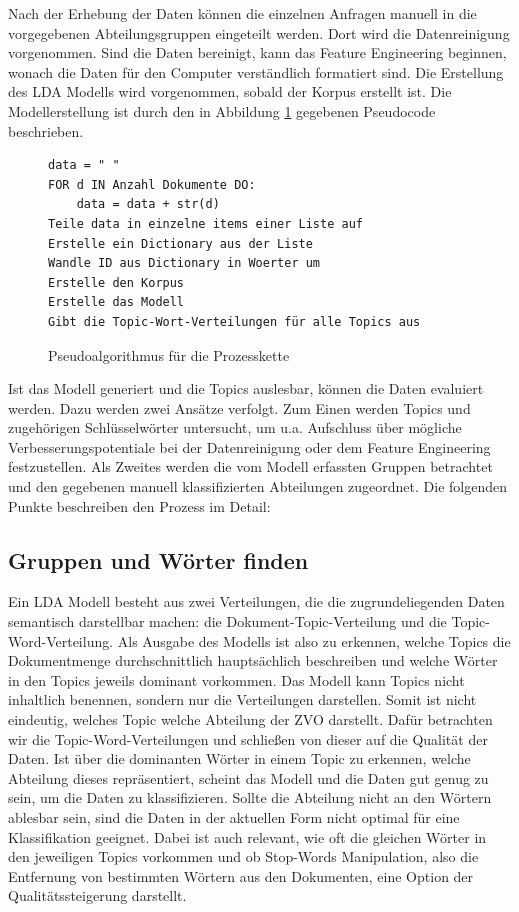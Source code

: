 \documentclass[german,version-2020-11]{uzl-thesis}
\begin{document}
Nach der Erhebung der Daten können die einzelnen Anfragen manuell in die vorgegebenen Abteilungsgruppen eingeteilt werden. Dort wird die Datenreinigung vorgenommen. Sind die Daten bereinigt, kann das Feature Engineering beginnen, wonach die Daten für den Computer verständlich formatiert sind. Die Erstellung des LDA Modells wird vorgenommen, sobald der Korpus erstellt ist. Die Modellerstellung ist durch den in Abbildung \ref{fig:code1} gegebenen Pseudocode beschrieben. \\


\begin{figure}[h]
\begin{lstlisting}
data = " "
FOR d IN Anzahl Dokumente DO:
    data = data + str(d)
Teile data in einzelne items einer Liste auf
Erstelle ein Dictionary aus der Liste
Wandle ID aus Dictionary in Woerter um
Erstelle den Korpus
Erstelle das Modell
Gibt die Topic-Wort-Verteilungen für alle Topics aus
\end{lstlisting}	
\caption{Pseudoalgorithmus für die Prozesskette}
\label{fig:code1}
\end{figure}


Ist das Modell generiert und die Topics auslesbar, können die Daten evaluiert werden. Dazu werden zwei Ansätze verfolgt. Zum Einen werden Topics und zugehörigen Schlüsselwörter untersucht, um u.a. Aufschluss über mögliche Verbesserungspotentiale bei der Datenreinigung oder dem Feature Engineering festzustellen. Als Zweites werden die vom Modell erfassten Gruppen betrachtet und den gegebenen manuell klassifizierten Abteilungen zugeordnet. Die folgenden Punkte beschreiben den Prozess im Detail: \\

\subsection{Gruppen und Wörter finden}
Ein LDA Modell besteht aus zwei Verteilungen, die die zugrundeliegenden Daten semantisch darstellbar machen: die Dokument-Topic-Verteilung und die Topic-Word-Verteilung. Als Ausgabe des Modells ist also zu erkennen, welche Topics die Dokumentmenge durchschnittlich hauptsächlich beschreiben und welche Wörter in den Topics jeweils dominant vorkommen. Das Modell kann Topics nicht inhaltlich benennen, sondern nur die Verteilungen darstellen. Somit ist nicht eindeutig, welches Topic welche Abteilung der ZVO darstellt. Dafür betrachten wir die Topic-Word-Verteilungen und schließen von dieser auf die Qualität der Daten. Ist über die dominanten Wörter in einem Topic zu erkennen, welche Abteilung dieses repräsentiert, scheint das Modell und die Daten gut genug zu sein, um die Daten zu klassifizieren. Sollte die Abteilung nicht an den Wörtern ablesbar sein, sind die Daten in der aktuellen Form nicht optimal für eine Klassifikation geeignet. Dabei ist auch relevant, wie oft die gleichen Wörter in den jeweiligen Topics vorkommen und ob Stop-Words Manipulation, also die Entfernung von bestimmten Wörtern aus den Dokumenten, eine Option der Qualitätssteigerung darstellt.
\end{document}
